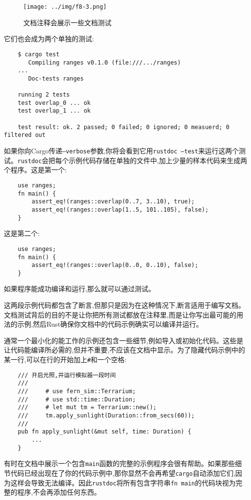 \begin{figure}[htbp]
    \centering
    \texttt{[image: ../img/f8-3.png]}
    \caption{文档注释会展示一些文档测试}
    \label{f8-3}
\end{figure}

它们也会成为两个单独的测试:
\begin{verbatim}
    $ cargo test
       Compiling ranges v0.1.0 (file:///.../ranges)
    ...
       Doc-tests ranges

    running 2 tests
    test overlap_0 ... ok
    test overlap_1 ... ok

    test result: ok. 2 passed; 0 failed; 0 ignored; 0 measuerd; 0 filtered out
\end{verbatim}

如果你向Cargo传递\texttt{--verbose}参数,你将会看到它用\texttt{rustdoc --test}来运行这两个测试。\texttt{rustdoc}会把每个示例代码存储在单独的文件中,加上少量的样本代码来生成两个程序。这是第一个:
\begin{verbatim}
    use ranges;
    fn main() {
        assert_eq!(ranges::overlap(0..7, 3..10), true);
        assert_eq!(ranges::overlap(1..5, 101..105), false);
    }
\end{verbatim}

这是第二个:
\begin{verbatim}
    use ranges;
    fn main() {
        assert_eq!(ranges::overlap(0..0, 0..10), false);
    }
\end{verbatim}
如果程序能成功编译和运行,那么就可以通过测试。

这两段示例代码都包含了断言,但那只是因为在这种情况下,断言适用于编写文档。文档测试背后的目的不是让你把所有测试都放在注释里,而是让你写出最可能的用法的示例,然后Rust确保你文档中的代码示例确实可以编译并运行。

通常一个最小化的能工作的示例还包含一些细节,例如导入或初始化代码。这些是让代码能编译所必需的,但并不重要,不应该在文档中显示。为了隐藏代码示例中的某一行,可以在行的开始加上\texttt{\#}和一个空格:
\begin{verbatim}
    /// 开启光照,并运行模拟器一段时间
    ///
    ///     # use fern_sim::Terrarium;
    ///     # use std::time::Duration;
    ///     # let mut tm = Terrarium::new();
    ///     tm.apply_sunlight(Duration::from_secs(60));
    ///
    pub fn apply_sunlight(&mut self, time: Duration) {
        ...
    }
\end{verbatim}

有时在文档中展示一个包含\texttt{main}函数的完整的示例程序会很有帮助。如果那些细节代码已经出现在了你的代码示例中,那你显然不会再希望\texttt{cargo}自动添加它们,因为这样会导致无法编译。因此\texttt{rustdoc}将所有包含字符串\texttt{fn main}的代码块视为完整的程序,不会再添加任何东西。

